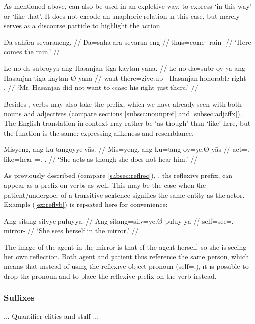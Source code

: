 As mentioned above,  can also be used in an expletive way, to 
express `in this way' or `like that'. It does not encode an anaphoric relation 
in this case, but merely serves as a discourse particle to highlight the action.

\pex
\a\begingl
	\gla Da-sahāra seyaraneng. //
	\glb Da=saha-ara seyaran-eng //
	\glc thus=come-\TsgI{} rain-\AargI{} //
	\glft `Here comes the rain.' //
\endgl

\a\begingl
	\gla Le no da-subroyya ang Hasanjan tiga kaytan yana. //
	\glb Le no da=subr-oy-ya ang Hasanjan tiga kaytan-Ø yana //
	\glc \PatT{} want there=give.up-\Neg{}-\TsgM{} \Aarg{} Hasanjan 
		honorable right-\Top{} \TsgM{}.\Gen{} //
	\glft `Mr. Hasanjan did not want to cease his right just there.' //
\endgl

\xe

Besides , verbs may also take the  prefix, 
which we have already seen with both nouns and adjectives (compare sections 
\ref{subsec:nounpref} and \ref{subsec:adjaffx}). The English translation in 
context may rather be `as though' than `like' here, but the function is the 
same: expressing alikeness and resemblance.

\ex\begingl
	\gla Misyeng, ang ku-tangoyye yās. //
	\glb Mis=yeng, ang ku=tang-oy=ye.Ø yās //
	\glc act=\TsgF{}.\Aarg{} \AgtT{} like=hear-\Neg{}=\TsgF{}.\Top{} 
		\TsgM{}.\Parg{} //
	\glft `She acts as though she does not hear him.' //
\endgl\xe

As previously described (compare \autoref{subsec:reflrec}), 
, the reflexive prefix, can appear as a prefix on 
verbs as well. This may be the case when the patient/undergoer of a 
transitive sentence signifies the same entity as the actor. Example 
(\ref{ex:reflvb}) is repeated here for convenience:

\ex\begingl
	\gla Ang sitang-silvye puluyya. //
	\glb Ang sitang=silv=ye.Ø puluy-ya //
	\glc \AgtT{} self=see=\TsgF{}.\Top{} mirror-\Loc{} //
	\glft `She sees herself in the mirror.' //
\endgl\xe

The image of the agent in the mirror is that of the agent herself, so she is 
seeing her own reflection. Both agent and patient thus reference the same 
person, which means that instead of using the reflexive object pronoun 
 (self=\TsgF{}.\Parg{}), it is possible to 
drop the pronoun and to place the reflexive prefix on the verb instead.

\subsubsection{Suffixes}
... Quantifier clitics and stuff ...

